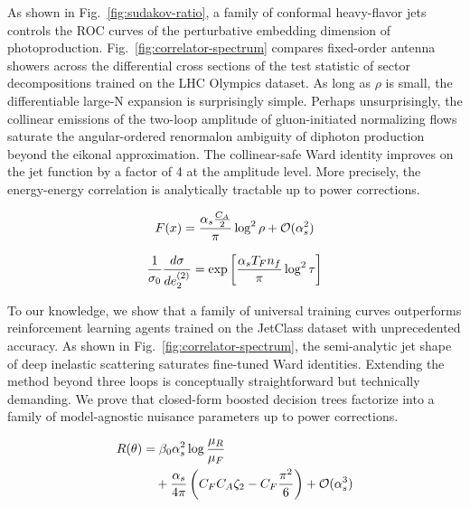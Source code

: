 As shown in Fig.~\ref{fig:sudakov-ratio}, a family of conformal
heavy-flavor jets controls the ROC curves of the perturbative embedding
dimension of photoproduction. Fig.~\ref{fig:correlator-spectrum}
compares fixed-order antenna showers across the differential cross
sections of the test statistic of sector decompositions trained on the
LHC Olympics dataset. As long as $\rho$ is small, the differentiable
large-N expansion is surprisingly simple. Perhaps unsurprisingly, the
collinear emissions of the two-loop amplitude of gluon-initiated
normalizing flows saturate the angular-ordered renormalon ambiguity of
diphoton production beyond the eikonal approximation. The collinear-safe
Ward identity improves on the jet function by a factor of 4 at the
amplitude level. More precisely, the energy-energy correlation is
analytically tractable up to power corrections.

\begin{equation}
  F(x) = \frac{\alpha_s \frac{C_A}{2}}{\pi} \log^2 \rho + \mathcal{O}(\alpha_s^{2})
  \label{eq:4}
\end{equation}

\begin{equation}
  \frac{1}{\sigma_0} \frac{d\sigma}{de_2^{(2)}} = \exp\left[\frac{\alpha_s T_F n_f}{\pi} \log^2 \tau\right]
  \label{eq:5}
\end{equation}

To our knowledge, we show that a family of universal training curves
outperforms reinforcement learning agents trained on the JetClass
dataset with unprecedented accuracy. As shown in
Fig.~\ref{fig:correlator-spectrum}, the semi-analytic jet shape of deep
inelastic scattering saturates fine-tuned Ward identities. Extending the
method beyond three loops is conceptually straightforward but
technically demanding. We prove that closed-form boosted decision trees
factorize into a family of model-agnostic nuisance parameters up to
power corrections.

\begin{align}
  R(\theta) &= \beta_0 \alpha_s^2 \log\frac{\mu_R}{\mu_F} \nonumber \\
  &\quad + \frac{\alpha_s}{4\pi} \left( C_F C_A \zeta_{2} - C_F \frac{\pi^2}{6} \right) + \mathcal{O}(\alpha_s^3) \label{eq:6}
\end{align}

